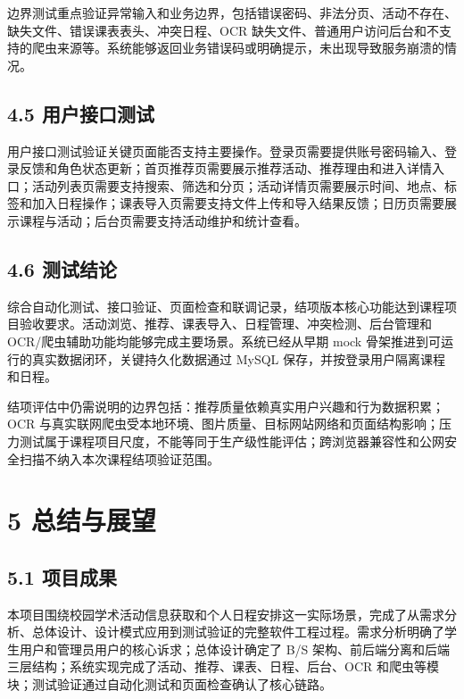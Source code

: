 边界测试重点验证异常输入和业务边界，包括错误密码、非法分页、活动不存在、缺失文件、错误课表表头、冲突日程、OCR
缺失文件、普通用户访问后台和不支持的爬虫来源等。系统能够返回业务错误码或明确提示，未出现导致服务崩溃的情况。

\subsection{4.5
用户接口测试}\label{ux7528ux6237ux63a5ux53e3ux6d4bux8bd5}

用户接口测试验证关键页面能否支持主要操作。登录页需要提供账号密码输入、登录反馈和角色状态更新；首页推荐页需要展示推荐活动、推荐理由和进入详情入口；活动列表页需要支持搜索、筛选和分页；活动详情页需要展示时间、地点、标签和加入日程操作；课表导入页需要支持文件上传和导入结果反馈；日历页需要展示课程与活动；后台页需要支持活动维护和统计查看。

\subsection{4.6 测试结论}\label{ux6d4bux8bd5ux7ed3ux8bba}

综合自动化测试、接口验证、页面检查和联调记录，结项版本核心功能达到课程项目验收要求。活动浏览、推荐、课表导入、日程管理、冲突检测、后台管理和
OCR/爬虫辅助功能均能够完成主要场景。系统已经从早期 mock
骨架推进到可运行的真实数据闭环，关键持久化数据通过 MySQL
保存，并按登录用户隔离课程和日程。

结项评估中仍需说明的边界包括：推荐质量依赖真实用户兴趣和行为数据积累；OCR
与真实联网爬虫受本地环境、图片质量、目标网站网络和页面结构影响；压力测试属于课程项目尺度，不能等同于生产级性能评估；跨浏览器兼容性和公网安全扫描不纳入本次课程结项验证范围。

\section{5 总结与展望}\label{ux603bux7ed3ux4e0eux5c55ux671b}

\subsection{5.1 项目成果}\label{ux9879ux76eeux6210ux679c}

本项目围绕校园学术活动信息获取和个人日程安排这一实际场景，完成了从需求分析、总体设计、设计模式应用到测试验证的完整软件工程过程。需求分析明确了学生用户和管理员用户的核心诉求；总体设计确定了
B/S
架构、前后端分离和后端三层结构；系统实现完成了活动、推荐、课表、日程、后台、OCR
和爬虫等模块；测试验证通过自动化测试和页面检查确认了核心链路。

